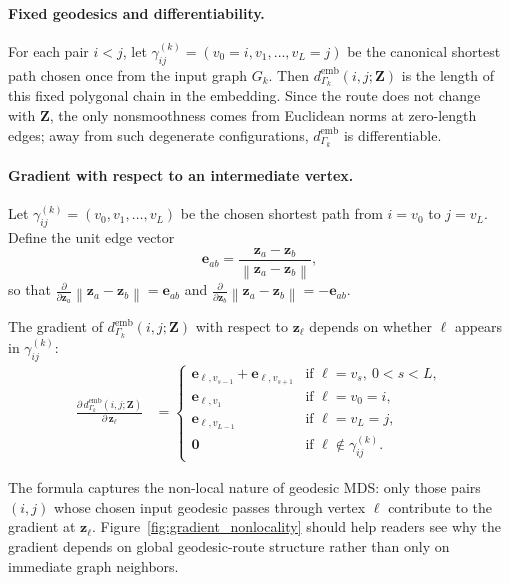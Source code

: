 \documentclass[twoside,11pt]{article}
\newcommand{\bz}{\mathbf{z}}
\newcommand{\bZ}{\mathbf{Z}}
\newcommand{\norm}[1]{\left\|#1\right\|}
\newcommand{\demb}{d^{\mathrm{emb}}}
\newcommand{\Gk}{G_k}
\begin{document}
\paragraph{Fixed geodesics and differentiability.}
For each pair $i < j$, let
$\gamma_{ij}^{(k)} = (v_0 = i, v_1, \ldots, v_L = j)$ be the canonical
shortest path chosen once from the input graph $\Gk$.  Then
$\demb_{\Gamma_k}(i,j;\bZ)$ is the length of this fixed polygonal chain in the
embedding.  Since the route does not change with $\bZ$, the only
nonsmoothness comes from Euclidean norms at zero-length edges; away from
such degenerate configurations, $\demb_{\Gamma_k}$ is differentiable.

\paragraph{Gradient with respect to an intermediate vertex.}
Let $\gamma_{ij}^{(k)} = (v_0, v_1, \ldots, v_L)$ be the chosen shortest
path from $i = v_0$ to $j = v_L$.  Define the unit edge vector
\begin{equation}
  \mathbf{e}_{ab} = \frac{\bz_a - \bz_b}{\norm{\bz_a - \bz_b}},
  \label{eq:unit_edge}
\end{equation}
so that $\frac{\partial}{\partial \bz_a}\norm{\bz_a - \bz_b} = \mathbf{e}_{ab}$
and $\frac{\partial}{\partial \bz_b}\norm{\bz_a - \bz_b} = -\mathbf{e}_{ab}$.

The gradient of $\demb_{\Gamma_k}(i,j;\bZ)$ with respect to $\bz_\ell$ depends on
whether $\ell$ appears in $\gamma_{ij}^{(k)}$:
\begin{align}
  \frac{\partial\, \demb_{\Gamma_k}(i,j;\bZ)}{\partial\, \bz_\ell}
  &= \begin{cases}
       \mathbf{e}_{\ell, v_{s-1}} + \mathbf{e}_{\ell, v_{s+1}}
         & \text{if } \ell = v_s,\ 0 < s < L, \\
       \mathbf{e}_{\ell, v_1}
         & \text{if } \ell = v_0 = i, \\
       \mathbf{e}_{\ell, v_{L-1}}
         & \text{if } \ell = v_L = j, \\
       \bm{0}
         & \text{if } \ell \notin \gamma_{ij}^{(k)}.
     \end{cases}
  \label{eq:geo_distance_gradient}
\end{align}

The formula captures the non-local nature of geodesic MDS: only those
pairs $(i,j)$ whose chosen input geodesic passes through vertex $\ell$ contribute
to the gradient at $\bz_\ell$.
Figure~\ref{fig:gradient_nonlocality} should help readers see why the
gradient depends on global geodesic-route structure rather than only on
immediate graph neighbors.
\end{document}
